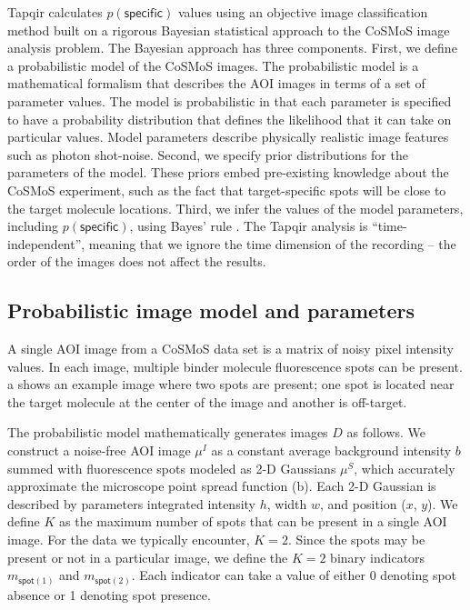 Tapqir calculates $p(\mathsf{specific})$ values using an objective image classification method built on a rigorous Bayesian statistical approach to the CoSMoS image analysis problem. The Bayesian approach has three components. First, we define a probabilistic model of the CoSMoS images. The probabilistic model is a mathematical formalism that describes the AOI images in terms of a set of parameter values.  The model is probabilistic in that each parameter is specified to have a probability distribution that defines the likelihood that it can take on particular values. Model parameters describe physically realistic image features such as photon shot-noise. Second, we specify prior distributions for the parameters of the model. These priors embed pre-existing knowledge about the CoSMoS experiment, such as the fact that target-specific spots will be close to the target molecule locations. Third, we infer the values of the model parameters, including $p(\mathsf{specific})$, using Bayes' rule \citep{Bishop2006-oa}. The Tapqir analysis is “time-independent”, meaning that we ignore the time dimension of the recording -- the order of the images does not affect the results. 

\subsection{Probabilistic image model and parameters} %

A single AOI image from a CoSMoS data set is a matrix of noisy pixel intensity values.  In each image, multiple binder molecule fluorescence spots can be present. a shows an example image where two spots are present; one spot is located near the target molecule at the center of the image and another is off-target.

The probabilistic model mathematically generates images $D$ as follows.  We construct a noise-free AOI image $\mu^I$ as a constant average background intensity $b$ summed with fluorescence spots modeled as 2-D Gaussians $\mu^S$, which accurately approximate the microscope point spread function \citep{Zhang2007-rb} (b). Each 2-D Gaussian is described by parameters integrated intensity $h$, width $w$, and position ($x$, $y$). We define $K$ as the maximum number of spots that can be present in a single AOI image.  For the data we typically encounter, $K = 2$. Since the spots may be present or not in a particular image, we define the $K = 2$ binary indicators $m_{\mathsf{spot}(1)}$ and $m_{\mathsf{spot}(2)}$.  Each indicator can take a value of either 0 denoting spot absence or 1 denoting spot presence. 

